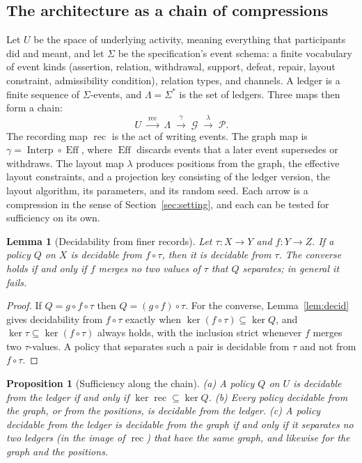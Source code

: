 \documentclass[11pt]{article}
\newtheorem{proposition}{Proposition}
\newtheorem{lemma}{Lemma}
\theoremstyle{definition}
\theoremstyle{remark}
\newcommand{\Eff}{\operatorname{Eff}}
\newcommand{\Interp}{\operatorname{Interp}}
\begin{document}
\subsection{The architecture as a chain of compressions}

Let $U$ be the space of underlying activity, meaning everything that participants did and meant, and let $\Sigma$ be the specification's event schema: a finite vocabulary of event kinds (assertion, relation, withdrawal, support, defeat, repair, layout constraint, admissibility condition), relation types, and channels. A ledger is a finite sequence of $\Sigma$-events, and $\Lambda=\Sigma^{*}$ is the set of ledgers. Three maps then form a chain:
\[
U\;\xrightarrow{\ \operatorname{rec}\ }\;\Lambda\;\xrightarrow{\ \gamma\ }\;\mathcal{G}\;\xrightarrow{\ \lambda\ }\;\mathcal{P}.
\]
The recording map $\operatorname{rec}$ is the act of writing events. The graph map is $\gamma=\Interp\circ\Eff$, where $\Eff$ discards events that a later event supersedes or withdraws. The layout map $\lambda$ produces positions from the graph, the effective layout constraints, and a projection key consisting of the ledger version, the layout algorithm, its parameters, and its random seed. Each arrow is a compression in the sense of Section~\ref{sec:setting}, and each can be tested for sufficiency on its own.

\begin{lemma}[Decidability from finer records]\label{lem:inherit}
Let $\tau:X\to Y$ and $f:Y\to Z$. If a policy $Q$ on $X$ is decidable from $f\circ\tau$, then it is decidable from $\tau$. The converse holds if and only if $f$ merges no two values of $\tau$ that $Q$ separates; in general it fails.
\end{lemma}

\begin{proof}
If $Q=g\circ f\circ\tau$ then $Q=(g\circ f)\circ\tau$. For the converse, Lemma~\ref{lem:decid} gives decidability from $f\circ\tau$ exactly when $\ker(f\circ\tau)\subseteq\ker Q$, and $\ker\tau\subseteq\ker(f\circ\tau)$ always holds, with the inclusion strict whenever $f$ merges two $\tau$-values. A policy that separates such a pair is decidable from $\tau$ and not from $f\circ\tau$.
\end{proof}

\begin{proposition}[Sufficiency along the chain]\label{prop:chain}
(a) A policy $Q$ on $U$ is decidable from the ledger if and only if $\ker\operatorname{rec}\subseteq\ker Q$. (b) Every policy decidable from the graph, or from the positions, is decidable from the ledger. (c) A policy decidable from the ledger is decidable from the graph if and only if it separates no two ledgers (in the image of $\operatorname{rec}$) that have the same graph, and likewise for the graph and the positions.
\end{proposition}
\end{document}
